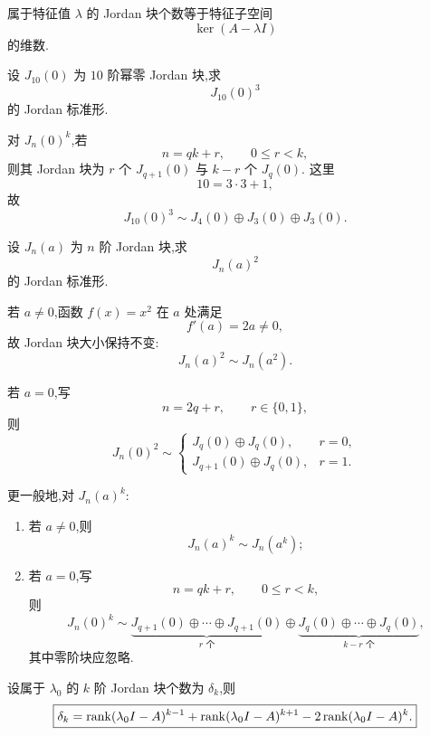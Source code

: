 \begin{proposition}[\markstar]
属于特征值 $\lambda$ 的 Jordan 块个数等于特征子空间
\[
\ker(A-\lambda I)
\]
的维数.
\end{proposition}


\begin{example}[\markstar]
设 $J_{10}(0)$ 为 $10$ 阶幂零 Jordan 块,求
\[
J_{10}(0)^3
\]
的 Jordan 标准形.
\end{example}
\exampleblank

\begin{solution}
对 $J_n(0)^k$,若
\[
n=qk+r,\qquad0\leq r<k,
\]
则其 Jordan 块为 $r$ 个 $J_{q+1}(0)$ 与 $k-r$ 个 $J_q(0)$.
这里
\[
10=3\cdot3+1,
\]
故
\[
\boxed{
J_{10}(0)^3
\sim
J_4(0)\oplus J_3(0)\oplus J_3(0).
}
\]
\end{solution}


\begin{example}[\markstar]
设 $J_n(a)$ 为 $n$ 阶 Jordan 块,求
\[
J_n(a)^2
\]
的 Jordan 标准形.
\end{example}
\exampleblank

\begin{solution}
若 $a\neq0$,函数 $f(x)=x^2$ 在 $a$ 处满足
\[
f'(a)=2a\neq0,
\]
故 Jordan 块大小保持不变:
\[
\boxed{J_n(a)^2\sim J_n(a^2)}.
\]

若 $a=0$,写
\[
n=2q+r,\qquad r\in\{0,1\},
\]
则
\[
\boxed{
J_n(0)^2
\sim
\begin{cases}
J_q(0)\oplus J_q(0),&r=0,\\[2mm]
J_{q+1}(0)\oplus J_q(0),&r=1.
\end{cases}
}
\]
\end{solution}


\begin{proposition}[\marktwostar]
更一般地,对 $J_n(a)^k$:
\begin{enumerate}
    \item 若 $a\neq0$,则
    \[
    J_n(a)^k\sim J_n(a^k);
    \]
    \item 若 $a=0$,写
    \[
    n=qk+r,\qquad0\leq r<k,
    \]
    则
    \[
    J_n(0)^k
    \sim
    \underbrace{J_{q+1}(0)\oplus\cdots\oplus J_{q+1}(0)}_{r\text{ 个}}
    \oplus
    \underbrace{J_q(0)\oplus\cdots\oplus J_q(0)}_{k-r\text{ 个}},
    \]
    其中零阶块应忽略.
\end{enumerate}
\end{proposition}

\begin{proposition}[\markstar]
设属于 $\lambda_0$ 的 $k$ 阶 Jordan 块个数为 $\delta_k$,则
\[
\boxed{
\delta_k
=
\operatorname{rank}(\lambda_0I-A)^{k-1}
+\operatorname{rank}(\lambda_0I-A)^{k+1}
-2\operatorname{rank}(\lambda_0I-A)^k.
}
\]
\end{proposition}


